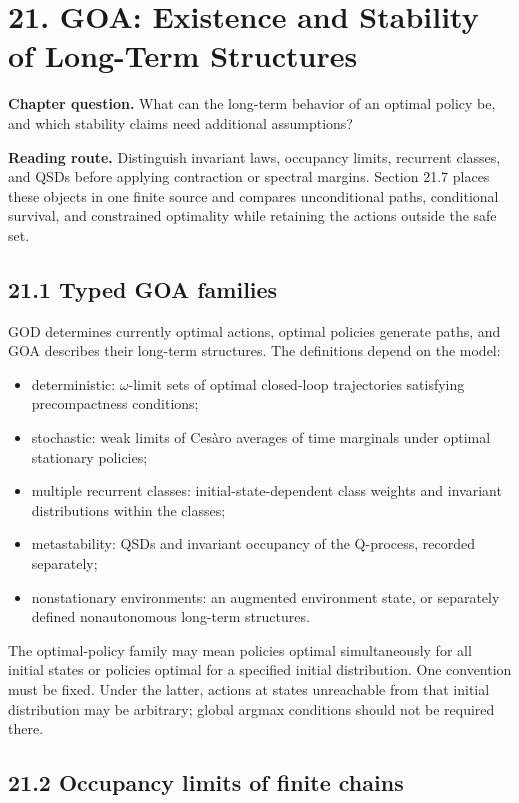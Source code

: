 \documentclass[
  english,
  11pt,
  oneside]{book}
\providecommand{\tightlist}{%
  \setlength{\itemsep}{0pt}\setlength{\parskip}{0pt}}
\begin{document}
\chapter{21. GOA: Existence and Stability of Long-Term Structures}\label{ch-21}

\textbf{Chapter question.} What can the long-term behavior of an optimal policy be, and which stability claims need additional assumptions?

\textbf{Reading route.} Distinguish invariant laws, occupancy limits, recurrent classes, and QSDs before applying contraction or spectral margins. Section 21.7 places these objects in one finite source and compares unconditional paths, conditional survival, and constrained optimality while retaining the actions outside the safe set.

\section{21.1 Typed GOA families}\label{typed-goa-families}

GOD determines currently optimal actions, optimal policies generate paths, and GOA describes their long-term structures. The definitions depend on the model:

\begin{itemize}
\tightlist
\item
  deterministic: \(\omega\)-limit sets of optimal closed-loop trajectories satisfying precompactness conditions;
\item
  stochastic: weak limits of Cesàro averages of time marginals under optimal stationary policies;
\item
  multiple recurrent classes: initial-state-dependent class weights and invariant distributions within the classes;
\item
  metastability: QSDs and invariant occupancy of the Q-process, recorded separately;
\item
  nonstationary environments: an augmented environment state, or separately defined nonautonomous long-term structures.
\end{itemize}

The optimal-policy family may mean policies optimal simultaneously for all initial states or policies optimal for a specified initial distribution. One convention must be fixed. Under the latter, actions at states unreachable from that initial distribution may be arbitrary; global argmax conditions should not be required there.

\section{21.2 Occupancy limits of finite chains}\label{occupancy-limits-of-finite-chains}
\end{document}
